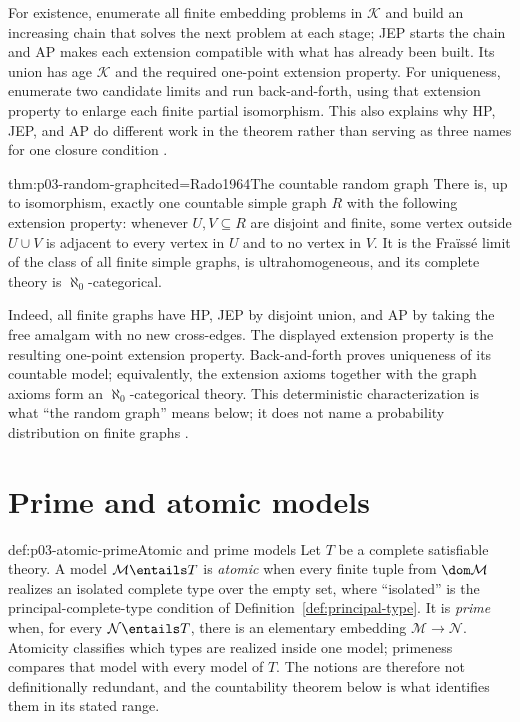 For existence, enumerate all finite embedding problems in \(\mathcal K\) and
build an increasing chain that solves the next problem at each stage; JEP
starts the chain and AP makes each extension compatible with what has already
been built.  Its union has age \(\mathcal K\) and the required one-point
extension property.  For uniqueness, enumerate two candidate limits and run
back-and-forth, using that extension property to enlarge each finite partial
isomorphism.  This also explains why HP, JEP, and AP do different work in the
theorem rather than serving as three names for one closure condition
\cite{Fraisse1954,Hodges1993}.

\begin{hbtheorem}{thm:p03-random-graph}{cited=Rado1964}{The countable random graph}
There is, up to isomorphism, exactly one countable simple graph \(R\) with the
following extension property: whenever \(U,V\subseteq R\) are disjoint and
finite, some vertex outside \(U\cup V\) is adjacent to every vertex in \(U\)
and to no vertex in \(V\).  It is the Fra\"iss\'e limit of the class of all
finite simple graphs, is ultrahomogeneous, and its complete theory is
\(\aleph_0\)-categorical.
\end{hbtheorem}

Indeed, all finite graphs have HP, JEP by disjoint union, and AP by taking the
free amalgam with no new cross-edges.  The displayed extension property is
the resulting one-point extension property.  Back-and-forth proves uniqueness
of its countable model; equivalently, the extension axioms together with the
graph axioms form an \(\aleph_0\)-categorical theory.  This deterministic
characterization is what ``the random graph'' means below; it does not name a
probability distribution on finite graphs \cite{Rado1964,Marker2002}.

\section{Prime and atomic models}
\label{sec:p03-prime-atomic}

\begin{hbdefinition}{def:p03-atomic-prime}{Atomic and prime models}
Let \(T\) be a complete satisfiable theory.  A model \(\mathcal M\entails T\) is
\emph{atomic} when every finite tuple from \(\dom\mathcal M\) realizes an
isolated complete type over the empty set, where ``isolated'' is the
principal-complete-type condition of
Definition~\ref{def:principal-type}.  It is \emph{prime} when, for every
\(\mathcal N\entails T\), there is an elementary embedding
\(\mathcal M\to\mathcal N\).  Atomicity classifies which types are realized
inside one model; primeness compares that model with every model of \(T\).
The notions are therefore not definitionally redundant, and the countability
theorem below is what identifies them in its stated range.
\end{hbdefinition}

